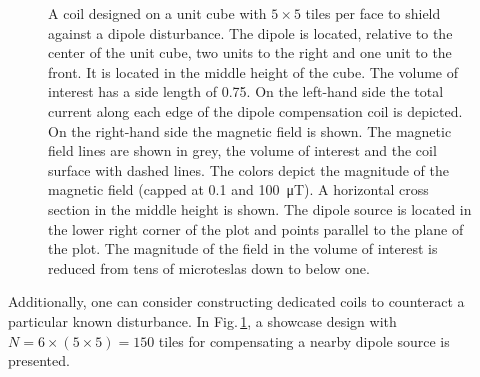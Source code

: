 \begin{figure}
  \centering
  \caption{A coil designed on a unit cube with $5 \times 5$ tiles per face to shield against a dipole disturbance. The dipole is located, relative to the center of the unit cube, two units to the right and one unit to the front. It is located in the middle height of the cube. The volume of interest has a side length of \num{0.75}. On the left-hand side the total current along each edge of the dipole compensation coil is depicted. On the right-hand side the magnetic field is shown. The magnetic field lines are shown in grey, the volume of interest and the coil surface with dashed lines. The colors depict the magnitude of the magnetic field (capped at \num{0.1} and \SI{100}{\micro\tesla}). A horizontal cross section in the middle height is shown. The dipole source is located in the lower right corner of the plot and points parallel to the plane of the plot. The magnitude of the field in the volume of interest is reduced from tens of microteslas down to below one.}\label{fig:showcase}
\end{figure}

Additionally, one can consider constructing dedicated coils to counteract a particular known disturbance. In Fig.\,\ref{fig:showcase}, a showcase design with $N = 6 \times (5 \times 5) = 150$ tiles for compensating a nearby dipole source is presented.

